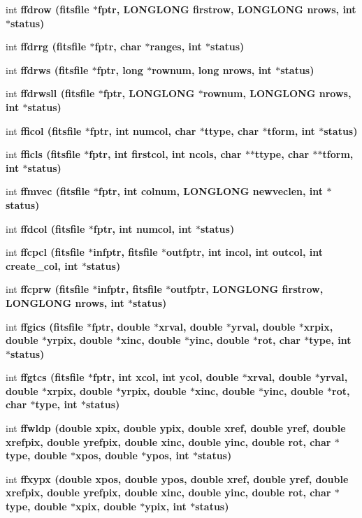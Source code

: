 \begin{CompactItemize}
\item 
int \bf{ffdrow} (\bf{fitsfile} $\ast$fptr, \bf{LONGLONG} firstrow, \bf{LONGLONG} nrows, int $\ast$status)
\item 
int \bf{ffdrrg} (\bf{fitsfile} $\ast$fptr, char $\ast$ranges, int $\ast$status)
\item 
int \bf{ffdrws} (\bf{fitsfile} $\ast$fptr, long $\ast$rownum, long nrows, int $\ast$status)
\item 
int \bf{ffdrwsll} (\bf{fitsfile} $\ast$fptr, \bf{LONGLONG} $\ast$rownum, \bf{LONGLONG} nrows, int $\ast$status)
\item 
int \bf{fficol} (\bf{fitsfile} $\ast$fptr, int numcol, char $\ast$ttype, char $\ast$tform, int $\ast$status)
\item 
int \bf{fficls} (\bf{fitsfile} $\ast$fptr, int firstcol, int ncols, char $\ast$$\ast$ttype, char $\ast$$\ast$tform, int $\ast$status)
\item 
int \bf{ffmvec} (\bf{fitsfile} $\ast$fptr, int colnum, \bf{LONGLONG} newveclen, int $\ast$status)
\item 
int \bf{ffdcol} (\bf{fitsfile} $\ast$fptr, int numcol, int $\ast$status)
\item 
int \bf{ffcpcl} (\bf{fitsfile} $\ast$infptr, \bf{fitsfile} $\ast$outfptr, int incol, int outcol, int create\_\-col, int $\ast$status)
\item 
int \bf{ffcprw} (\bf{fitsfile} $\ast$infptr, \bf{fitsfile} $\ast$outfptr, \bf{LONGLONG} firstrow, \bf{LONGLONG} nrows, int $\ast$status)
\item 
int \bf{ffgics} (\bf{fitsfile} $\ast$fptr, double $\ast$xrval, double $\ast$yrval, double $\ast$xrpix, double $\ast$yrpix, double $\ast$xinc, double $\ast$yinc, double $\ast$rot, char $\ast$type, int $\ast$status)
\item 
int \bf{ffgtcs} (\bf{fitsfile} $\ast$fptr, int xcol, int ycol, double $\ast$xrval, double $\ast$yrval, double $\ast$xrpix, double $\ast$yrpix, double $\ast$xinc, double $\ast$yinc, double $\ast$rot, char $\ast$type, int $\ast$status)
\item 
int \bf{ffwldp} (double xpix, double ypix, double xref, double yref, double xrefpix, double yrefpix, double xinc, double yinc, double rot, char $\ast$type, double $\ast$xpos, double $\ast$ypos, int $\ast$status)
\item 
int \bf{ffxypx} (double xpos, double ypos, double xref, double yref, double xrefpix, double yrefpix, double xinc, double yinc, double rot, char $\ast$type, double $\ast$xpix, double $\ast$ypix, int $\ast$status)

\end{CompactItemize}
